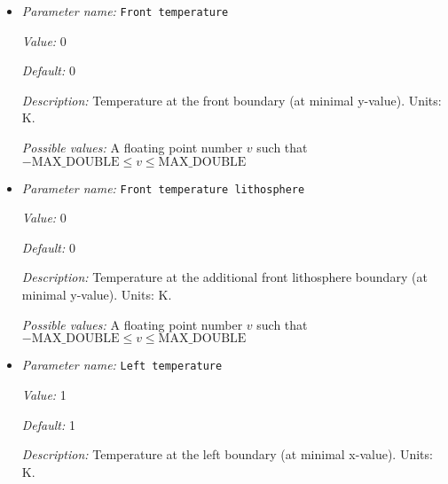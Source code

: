 \begin{itemize}
{\it Possible values:} A floating point number $v$ such that $-\text{MAX\_DOUBLE} \leq v \leq \text{MAX\_DOUBLE}$
\item {\it Parameter name:} {\tt Front temperature}
\label{parameters:Boundary temperature model/Box with lithosphere boundary indicators/Front temperature}
\label{parameters:Boundary_20temperature_20model/Box_20with_20lithosphere_20boundary_20indicators/Front_20temperature}


{\it Value:} 0


{\it Default:} 0


{\it Description:} Temperature at the front boundary (at minimal y-value). Units: K.


{\it Possible values:} A floating point number $v$ such that $-\text{MAX\_DOUBLE} \leq v \leq \text{MAX\_DOUBLE}$
\item {\it Parameter name:} {\tt Front temperature lithosphere}
\label{parameters:Boundary temperature model/Box with lithosphere boundary indicators/Front temperature lithosphere}
\label{parameters:Boundary_20temperature_20model/Box_20with_20lithosphere_20boundary_20indicators/Front_20temperature_20lithosphere}


{\it Value:} 0


{\it Default:} 0


{\it Description:} Temperature at the additional front lithosphere boundary (at minimal y-value). Units: K.


{\it Possible values:} A floating point number $v$ such that $-\text{MAX\_DOUBLE} \leq v \leq \text{MAX\_DOUBLE}$
\item {\it Parameter name:} {\tt Left temperature}
\label{parameters:Boundary temperature model/Box with lithosphere boundary indicators/Left temperature}
\label{parameters:Boundary_20temperature_20model/Box_20with_20lithosphere_20boundary_20indicators/Left_20temperature}


{\it Value:} 1


{\it Default:} 1


{\it Description:} Temperature at the left boundary (at minimal x-value). Units: K.



\end{itemize}
